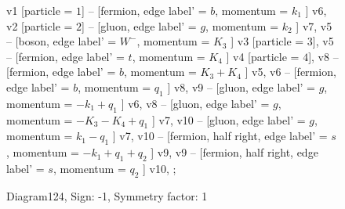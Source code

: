 \documentclass{revtex4}
\begin{document}
\begin{figure}[!htb]
\begin{center}
{    %
v1 [particle = \(1\)] -- [fermion, edge label' = \(b\), momentum = \(k_{1}\) ] v6, 
v2 [particle = \(2\)] -- [gluon, edge label' = \(g\), momentum = \(k_{2}\) ] v7, 
v5 -- [boson, edge label' = \(W^{-}\), momentum = \(K_{3}\) ] v3 [particle = \(3\)], 
v5 -- [fermion, edge label' = \(t\), momentum = \(K_{4}\) ] v4 [particle = \(4\)], 
v8 -- [fermion, edge label' = \(b\), momentum = \(K_{3} + K_{4}\) ] v5, 
v6 -- [fermion, edge label' = \(b\), momentum = \(q_{1}\) ] v8, 
v9 -- [gluon, edge label' = \(g\), momentum = \(-k_{1} + q_{1}\) ] v6, 
v8 -- [gluon, edge label' = \(g\), momentum = \(-K_{3} - K_{4} + q_{1}\) ] v7, 
v10 -- [gluon, edge label' = \(g\), momentum = \(k_{1} - q_{1}\) ] v7, 
v10 -- [fermion, half right, edge label' = \(s\), momentum = \(-k_{1} + q_{1} + q_{2}\) ] v9, 
v9 -- [fermion, half right, edge label' = \(s\), momentum = \(q_{2}\) ] v10, 
};
\end{center}
\caption{Diagram124, Sign: -1, Symmetry factor: 1}
\end{figure}
\newpage
\end{document}
